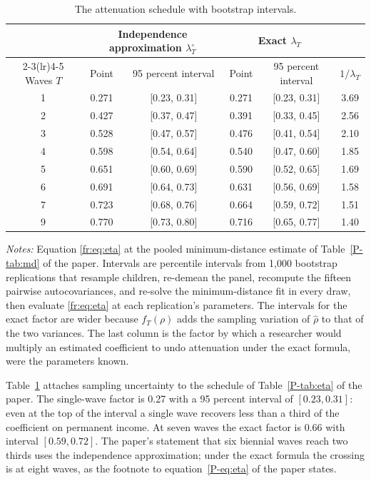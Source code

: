 \begin{table}[!htb]
\centering
\small
\caption{The attenuation schedule with bootstrap intervals.}
\label{fr:tab:etaboot}
\begin{tabular}{@{}cccccc@{}}
\toprule
& \multicolumn{2}{c}{Independence approximation $\lambda^{\circ}_T$} & \multicolumn{2}{c}{Exact $\lambda_T$} & \\
\cmidrule(lr){2-3}\cmidrule(lr){4-5}
Waves $T$ & Point & 95 percent interval & Point & 95 percent interval & $1/\lambda_T$ \\
\midrule
1 & 0.271 & [0.23, 0.31] & 0.271 & [0.23, 0.31] & 3.69 \\
2 & 0.427 & [0.37, 0.47] & 0.391 & [0.33, 0.45] & 2.56 \\
3 & 0.528 & [0.47, 0.57] & 0.476 & [0.41, 0.54] & 2.10 \\
4 & 0.598 & [0.54, 0.64] & 0.540 & [0.47, 0.60] & 1.85 \\
5 & 0.651 & [0.60, 0.69] & 0.590 & [0.52, 0.65] & 1.69 \\
6 & 0.691 & [0.64, 0.73] & 0.631 & [0.56, 0.69] & 1.58 \\
7 & 0.723 & [0.68, 0.76] & 0.664 & [0.59, 0.72] & 1.51 \\
9 & 0.770 & [0.73, 0.80] & 0.716 & [0.65, 0.77] & 1.40 \\
\bottomrule
\end{tabular}
\par\smallskip
\begin{minipage}{0.92\textwidth}
\footnotesize\emph{Notes:} Equation \eqref{fr:eq:eta} at the pooled
minimum-distance estimate of Table~\ref{P-tab:md} of the paper. Intervals
are percentile intervals from 1,000 bootstrap replications that resample
children, re-demean the panel, recompute the fifteen pairwise
autocovariances, and re-solve the minimum-distance fit in every draw, then
evaluate \eqref{fr:eq:eta} at each replication's parameters. The intervals
for the exact factor are wider because $f_T(\rho)$ adds the sampling
variation of $\hat\rho$ to that of the two variances. The last column is
the factor by which a researcher would multiply an estimated coefficient
to undo attenuation under the exact formula, were the parameters known.
\end{minipage}
\end{table}

Table~\ref{fr:tab:etaboot} attaches sampling uncertainty to the schedule
of Table~\ref{P-tab:eta} of the paper. The single-wave factor is 0.27 with a 95 percent interval of $[0.23, 0.31]$: even at the top of the interval a single wave recovers less than a third of the coefficient on permanent income. At seven waves the exact factor is 0.66 with interval $[0.59, 0.72]$. The paper's statement that six biennial waves reach two thirds uses the independence approximation; under the exact formula the crossing is at eight waves, as the footnote to
equation~\eqref{P-eq:eta} of the paper states.

